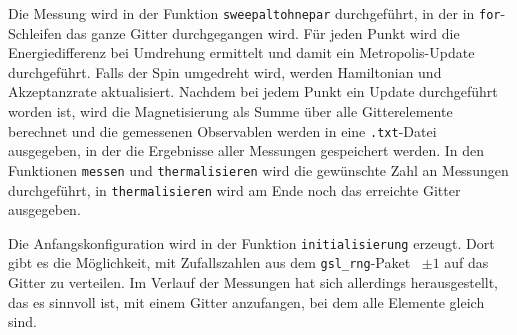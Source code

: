 	Die Messung wird in der Funktion \texttt{sweepaltohnepar} durchgeführt, in der in \texttt{for}-Schleifen das ganze Gitter durchgegangen wird. Für jeden Punkt wird die Energiedifferenz bei Umdrehung ermittelt und damit ein Metropolis-Update durchgeführt. Falls der Spin umgedreht wird, werden Hamiltonian und Akzeptanzrate aktualisiert. Nachdem bei jedem Punkt ein Update durchgeführt worden ist, wird die Magnetisierung als Summe über alle Gitterelemente berechnet und die gemessenen Observablen werden in eine \texttt{.txt}-Datei ausgegeben, in der die Ergebnisse aller Messungen gespeichert werden.
	In den Funktionen \texttt{messen} und \texttt{thermalisieren} wird die gewünschte Zahl an Messungen durchgeführt, in \texttt{thermalisieren} wird am Ende noch das erreichte Gitter ausgegeben.
	
	
	Die Anfangskonfiguration wird in der Funktion \texttt{initialisierung} erzeugt. Dort gibt es die Möglichkeit, mit Zufallszahlen aus dem \texttt{gsl\_rng}-Paket~\cite{gsldoc} $\pm 1$ auf das Gitter zu verteilen. Im Verlauf der Messungen hat sich allerdings herausgestellt, das es sinnvoll ist, mit einem Gitter anzufangen, bei dem alle Elemente gleich sind. 
	
